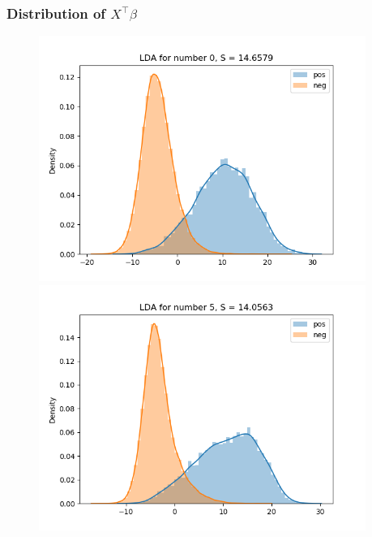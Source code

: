 \documentclass{article}
\begin{document}
\subsubsection{Distribution of $X^\top\beta$}
\begin{figure}[H]
    \centering
    \begin{minipage}{0.19\textwidth}
        \centering
        \includegraphics[width=0.95\textwidth]{fig/lda/0.png}
        \includegraphics[width=0.95\textwidth]{fig/lda/5.png}
    \end{minipage}
    \begin{minipage}{0.19\textwidth}
        \centering

\end{minipage}
\end{figure}
\end{document}
